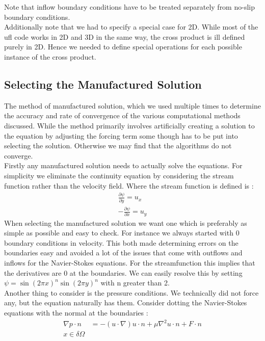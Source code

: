 \documentclass[11pt,twoside,a4paper]{article}
\begin{document}
Note that inflow boundary conditions have to be treated separately from no-slip boundary conditions.\\
Additionally note that we had to specify a special case for 2D. While most of the ufl code works in 2D and 3D in the same way, the cross product is ill defined purely in 2D. Hence we needed to define special operations for each possible instance of the cross product.\\

\subsection{Selecting the Manufactured Solution}
The method of manufactured solution, which we used multiple times to determine the accuracy and rate of convergence of the various computational methods discussed. While the method primarily involves artificially creating a solution to the equation by adjusting the forcing term some though has to be put into selecting the solution. Otherwise we may find that the algorithms do not converge.\\
Firstly any manufactured solution needs to actually solve the equations. For simplicity we eliminate the continuity equation by considering the stream function rather than the velocity field. Where the stream function is defined is :
\begin{align*}
\frac{ \partial \psi}{\partial y} = u_x \\
-\frac{\partial \psi}{\partial x} = u_y
\end{align*}
When selecting the manufactured solution we want one which is preferably as simple as possible and easy to check. For instance we always started with $0$ boundary conditions in velocity. This both made determining errors on the boundaries easy and avoided a lot of the issues that come with outflows and inflows for the Navier-Stokes equations. For the streamfunction this implies that the derivatives are 0 at the boundaries. We can easily resolve this by setting $\psi = \sin(2 \pi x)^n \sin(2 \pi y)^n$ with n greater than 2.\\
Another thing to consider is the pressure conditions. We technically did not force any, but the equation naturally has them. Consider dotting the Navier-Stokes equations with the normal at the boundaries :
\begin{align*}
\nabla p \cdot n &= -(u \cdot \nabla) u \cdot n  + \mu \nabla^2 u \cdot n + F \cdot n \\
x \in \delta \Omega
\end{align*}
\end{document}
